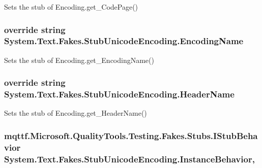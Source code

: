 Sets the stub of Encoding.\-get\-\_\-\-Code\-Page()

\hypertarget{class_system_1_1_text_1_1_fakes_1_1_stub_unicode_encoding_ab3ed5338929d5b94beb6705507335e45}{
\subsubsection[{Encoding\-Name}]{\setlength{\rightskip}{0pt plus 5cm}override string System.\-Text.\-Fakes.\-Stub\-Unicode\-Encoding.\-Encoding\-Name\hspace{0.3cm}{\ttfamily [get]}}}\label{class_system_1_1_text_1_1_fakes_1_1_stub_unicode_encoding_ab3ed5338929d5b94beb6705507335e45}


Sets the stub of Encoding.\-get\-\_\-\-Encoding\-Name()

\hypertarget{class_system_1_1_text_1_1_fakes_1_1_stub_unicode_encoding_abafe99989c8528d3c438cdb8e7ac045f}{
\subsubsection[{Header\-Name}]{\setlength{\rightskip}{0pt plus 5cm}override string System.\-Text.\-Fakes.\-Stub\-Unicode\-Encoding.\-Header\-Name\hspace{0.3cm}{\ttfamily [get]}}}\label{class_system_1_1_text_1_1_fakes_1_1_stub_unicode_encoding_abafe99989c8528d3c438cdb8e7ac045f}


Sets the stub of Encoding.\-get\-\_\-\-Header\-Name()

\hypertarget{class_system_1_1_text_1_1_fakes_1_1_stub_unicode_encoding_a0a1ca8054e5bb1e09eb53b242a7ab5b7}{
\subsubsection[{Instance\-Behavior}]{\setlength{\rightskip}{0pt plus 5cm}mqttf.\-Microsoft.\-Quality\-Tools.\-Testing.\-Fakes.\-Stubs.\-I\-Stub\-Behavior System.\-Text.\-Fakes.\-Stub\-Unicode\-Encoding.\-Instance\-Behavior\hspace{0.3cm}{\ttfamily [get]}, {\ttfamily [set]}}}\label{class_system_1_1_text_1_1_fakes_1_1_stub_unicode_encoding_a0a1ca8054e5bb1e09eb53b242a7ab5b7}


